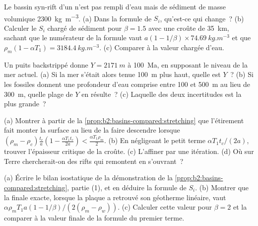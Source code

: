 \begin{exercise}[$\star\star$]\label{exo:b2:basins-compared:8}
Le bassin syn-rift d'un  n'est pas rempli d'eau mais de sédiment de masse volumique
\qty{2300}{kg.m^{-3}}. (a) Dans la formule de $S_i$, qu'est-ce qui change~? (b) Calculer le $S_i$ chargé de sédiment
pour $\beta = 1.5$ avec une croûte de \qty{35}{km}, sachant que le numérateur de la formule vaut
$a(1 - 1/\beta)\times\qty{74.69}{kg.m^{-3}}$ et que $\rho_m(1 - \alpha T_1) =
\qty{3184.4}{kg.m^{-3}}$. (c) Comparer à la valeur chargée d'eau.
\end{exercise}

\begin{exercise}[$\star\star$]\label{exo:b2:basins-compared:9}
Un puits backstrippé donne $Y = \qty{2171}{m}$ à \qty{100}{Ma}, en supposant le niveau de la mer actuel. (a)
Si la mer s'était alors tenue \qty{100}{m} plus haut, quelle est $Y$~? (b) Si les fossiles donnent une profondeur d'eau
comprise entre 100 et \qty{500}{m} au lieu de \qty{300}{m}, quelle plage de $Y$ en résulte~? (c) Laquelle des
deux incertitudes est la plus grande~?
\end{exercise}

\begin{exercise}[$\star\star\star$]\label{exo:b2:basins-compared:10}
(a) Montrer à partir de la \cref{prop:b2:basins-compared:stretching} que l'étirement fait monter la surface
au lieu de la faire descendre lorsque $(\rho_m - \rho_c)\frac{t_c}{a}\left(1 - \frac{\alpha T_1 t_c}{2a}\right) <
\frac{\alpha T_1\rho_m}{2}$. (b) En négligeant le petit terme $\alpha T_1 t_c/(2a)$, trouver l'épaisseur
critique de la croûte. (c) L'affiner par une itération. (d) Où sur Terre chercherait-on des rifts qui
remontent en s'ouvrant~?
\end{exercise}

\begin{exercise}[$\star\star\star$]\label{exo:b2:basins-compared:11}
(a) Écrire le bilan isostatique de la démonstration de la \cref{prop:b2:basins-compared:stretching}, partie
(1), et en déduire la formule de $S_i$. (b) Montrer que la  finale exacte, lorsque la
plaque a retrouvé son géotherme linéaire, vaut $\alpha\rho_m T_1 a(1 - 1/\beta)/(2(\rho_m -
\rho_w))$. (c) Calculer cette valeur pour $\beta = 2$ et la comparer à la
valeur finale de la formule du premier terme.
\end{exercise}

